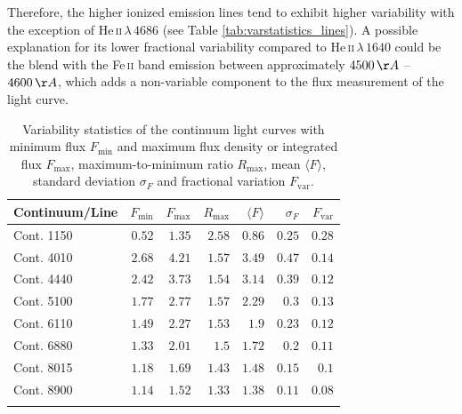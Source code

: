 Therefore, the higher ionized emission lines tend to exhibit higher variability with the exception of He\,\textsc{ii}$\,\lambda\,4686$ (see Table \ref{tab:varstatistics_lines}). A possible explanation for its lower fractional variability compared to  He\,\textsc{ii}$\,\lambda\,1640$ could be the blend with the Fe\,\textsc{ii} band emission between approximately $ 4500\,\AA$ -- $4600\,\AA$, which adds a non-variable component to the flux measurement of the light curve.


\begin{table}[htp] 
	\centering 
	\caption[Continuum variability statistics]{Variability statistics of the continuum light curves with minimum flux $F_{\text{min}}$ and maximum flux density or integrated flux $F_{\text{max}}$, maximum-to-minimum ratio $R_{\text{max}}$, mean $\langle F \rangle$, standard deviation $\sigma_F$ and fractional variation $F_{\text{var}}$.} 
	\begin{tabular}{lrrrrrr} 
		\hline 
		\hline 
		\textbf{Continuum/Line} &  {$F_{\text{min}}$} &  {$F_{\text{max}}$} &  {$R_{\text{max}}$} &  {$\langle F \rangle$} &  {$\sigma_F$} &  {$F_{\text{var}}$} \\ 
		\hline
		\hline
		Cont. 1150  & $0.52$ & $1.35$ & $2.58$ & $0.86$ & $0.25$ & $0.28$ \\
		Cont. 4010  & $2.68$ & $4.21$ & $1.57$ & $3.49$ & $0.47$ & $0.14$ \\
		Cont. 4440  & $2.42$ & $3.73$ & $1.54$ & $3.14$ & $0.39$ & $0.12$ \\
		Cont. 5100  & $1.77$ & $2.77$ & $1.57$ & $2.29$ & $0.3$ & $0.13$ \\
		Cont. 6110  & $1.49$ & $2.27$ & $1.53$ & $1.9$ & $0.23$ & $0.12$ \\
		Cont. 6880  & $1.33$ & $2.01$ & $1.5$ & $1.72$ & $0.2$ & $0.11$ \\
		Cont. 8015  & $1.18$ & $1.69$ & $1.43$ & $1.48$ & $0.15$ & $0.1$ \\
		Cont. 8900  & $1.14$ & $1.52$ & $1.33$ & $1.38$ & $0.11$ & $0.08$ \\
		\hline 
		\hline 
		\label{tab:varstatistics_continua} 
	\end{tabular} 
\end{table}
